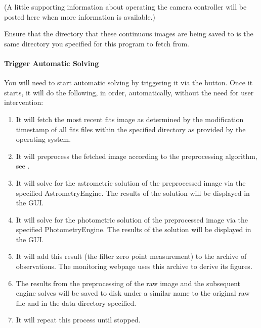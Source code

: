 \documentclass[letterpaper,11pt,english]{sphinxmanual}
\begin{document}
\sphinxAtStartPar
(A little supporting information about operating the camera controller will
be posted here when more information is available.)

\sphinxAtStartPar
Ensure that the directory that these continuous images are being saved to is
the same directory you specified for this program to fetch from.


\paragraph{Trigger Automatic Solving}
\label{\detokenize{user/automatic_mode:trigger-automatic-solving}}
\sphinxAtStartPar
You will need to start automatic solving by triggering it via the
 button. Once it starts, it will do the following, in order,
automatically, without the need for user intervention:
\begin{enumerate}
%
\item {} 
\sphinxAtStartPar
It will fetch the most recent fits image as determined by the modification timestamp of all fits files within the specified directory as provided by the operating system.

\item {} 
\sphinxAtStartPar
It will pre\sphinxhyphen{}process the fetched image according to the preprocessing algorithm, see {\hyperref[\detokenize{technical/architecture/vehicles_solutions:technical-architecture-vehicles-solutions-preprocesssolution}]{}}.

\item {} 
\sphinxAtStartPar
It will solve for the astrometric solution of the pre\sphinxhyphen{}processed image via the specified AstrometryEngine. The results of the solution will be displayed in the GUI.

\item {} 
\sphinxAtStartPar
It will solve for the photometric solution of the pre\sphinxhyphen{}processed image via the specified PhotometryEngine. The results of the solution will be displayed in the GUI.

\item {} 
\sphinxAtStartPar
It will add this result (the filter zero point measurement) to the archive of observations. The monitoring webpage uses this archive to derive its figures.

\item {} 
\sphinxAtStartPar
The results from the pre\sphinxhyphen{}processing of the raw image and the subsequent engine solves will be saved to disk under a similar name to the original raw file and in the data directory specified.

\item {} 
\sphinxAtStartPar
It will repeat this process until stopped.

\end{enumerate}
\end{document}
